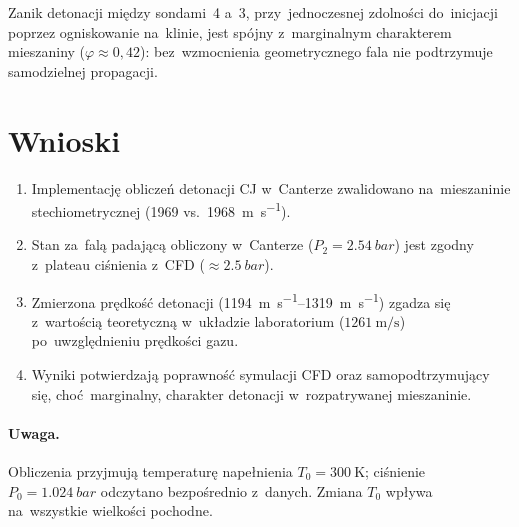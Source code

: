 \documentclass[11pt,a4paper]{article}
\begin{document}
Zanik detonacji między sondami~4 a~3, przy~jednoczesnej zdolności do~inicjacji
poprzez ogniskowanie na~klinie, jest spójny z~marginalnym charakterem
mieszaniny ($\varphi\approx0{,}42$): bez~wzmocnienia geometrycznego fala nie
podtrzymuje samodzielnej propagacji.

\section{Wnioski}
\begin{enumerate}
\item Implementację obliczeń detonacji CJ w~Canterze zwalidowano na~mieszaninie
stechiometrycznej (\SI{1969}{} vs.~\SI{1968}{\meter\per\second}).
\item Stan za~falą padającą obliczony w~Canterze ($P_2=\SI{2,54}{bar}$) jest
zgodny z~plateau ciśnienia z~CFD ($\approx\SI{2,5}{bar}$).
\item Zmierzona prędkość detonacji (\SIrange{1194}{1319}{\meter\per\second})
zgadza się z~wartością teoretyczną w~układzie laboratorium
($\SI{1261}{\meter\per\second}$) po~uwzględnieniu prędkości gazu.
\item Wyniki potwierdzają poprawność symulacji CFD oraz samopodtrzymujący się,
choć~marginalny, charakter detonacji w~rozpatrywanej mieszaninie.
\end{enumerate}

\paragraph{Uwaga.} Obliczenia przyjmują temperaturę napełnienia
$T_0=\SI{300}{\kelvin}$; ciśnienie $P_0=\SI{1,024}{bar}$ odczytano
bezpośrednio z~danych. Zmiana $T_0$ wpływa na~wszystkie wielkości pochodne.
\end{document}
